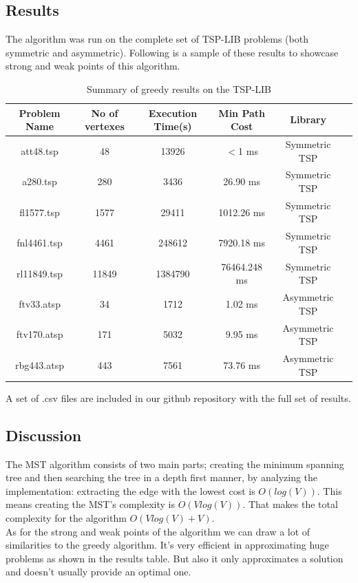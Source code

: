 \documentclass[11pt, english]{article}
\begin{document}
\subsection{Results}
\begin{table}[!h]
	The algorithm was run on the complete set of TSP-LIB problems (both symmetric and asymmetric). Following is a sample of these results to showcase strong and weak points of this algorithm.
	\bigskip
	
	\centering
	\begin{tabular}{|c|c|c|c|c|c|}
		\hline
		Problem Name & No of vertexes  & Execution Time(s) & Min Path Cost &  Library  \\
		\hline\hline
		att48.tsp & 48 & 13926 & $<$1 ms & Symmetric TSP\\
		\hline
		a280.tsp & 280 & 3436 & 26.90 ms & Symmetric TSP\\
		\hline
		fl1577.tsp & 1577 & 29411 & 1012.26 ms & Symmetric TSP\\
		\hline
		fnl4461.tsp & 4461 & 248612 & 7920.18 ms & Symmetric TSP\\
		\hline
		rl11849.tsp & 11849 & 1384790 & 76464.248 ms & Symmetric TSP\\
		\hline\hline
		ftv33.atsp & 34 & 1712 & 1.02 ms & Asymmetric TSP\\
		\hline
		ftv170.atsp & 171 & 5032 & 9.95 ms & Asymmetric TSP\\
		\hline
		rbg443.atsp & 443 & 7561 & 73.76 ms & Asymmetric TSP\\
		\hline
		\hline
	\end{tabular}
	\begin{tablenotes}
		\small
		\item A set of .csv files are included in our github repository with the full set of results.
	\end{tablenotes}
	\caption{Summary of greedy results on the TSP-LIB}
	\label{greedy_table}
\end{table}

\subsection{Discussion}
The MST algorithm consists of two main parts; creating the minimum spanning tree and then searching the tree in a depth first manner, by analyzing the implementation: extracting the edge with the lowest cost is $O(log(V))$. This means creating the MST's complexity is $O(Vlog(V))$. That makes the total complexity for the algorithm $O(Vlog(V) + V)$.\\
As for the strong and weak points of the algorithm we can draw a lot of similarities to the greedy algorithm. It's very efficient in approximating huge problems as shown in the results table. But also it only approximates a solution and doesn't usually provide an optimal one.
\end{document}
